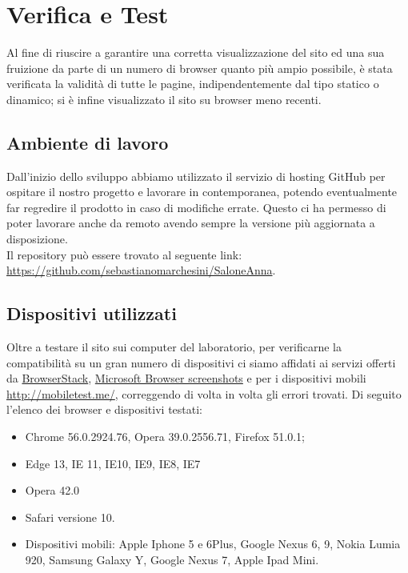 \section{Verifica e Test}{
	Al fine di riuscire a garantire una corretta visualizzazione del sito ed una sua fruizione da parte di un numero di browser quanto più ampio possibile, è stata verificata la validità di tutte le pagine, indipendentemente dal tipo statico o dinamico; si è infine visualizzato il sito su browser meno recenti.
	\subsection{Ambiente di lavoro}{
		Dall'inizio dello sviluppo abbiamo utilizzato il servizio di hosting GitHub per ospitare il nostro progetto e lavorare in contemporanea, potendo eventualmente far regredire il prodotto in caso di modifiche errate. Questo ci ha permesso di poter lavorare anche da remoto avendo sempre la versione più aggiornata a disposizione.\\
		Il repository può essere trovato al seguente link: \url{https://github.com/sebastianomarchesini/SaloneAnna}.
	}
	\subsection{Dispositivi utilizzati}{
		Oltre a testare il sito sui computer del laboratorio, per verificarne la compatibilità su un gran numero di dispositivi ci siamo affidati ai servizi offerti da \href{https://www.browserstack.com/screenshots}{BrowserStack}, \href{https://developer.microsoft.com/en-us/microsoft-edge/tools/screenshots/}{Microsoft Browser screenshots} e per i dispositivi mobili \url{http://mobiletest.me/}, correggendo di volta in volta gli errori trovati.
		Di seguito l'elenco dei browser e dispositivi testati:
		\begin{itemize}\itemsep1pt
			\item Chrome 56.0.2924.76, Opera 39.0.2556.71, Firefox 51.0.1;
			\item Edge 13, IE 11, IE10, IE9, IE8, IE7
			\item Opera 42.0
			\item Safari versione 10.
			\item Dispositivi mobili: Apple Iphone 5 e 6Plus, Google Nexus 6, 9, Nokia Lumia 920, Samsung Galaxy Y, Google Nexus 7, Apple Ipad Mini.
		\end{itemize}
	}
}
